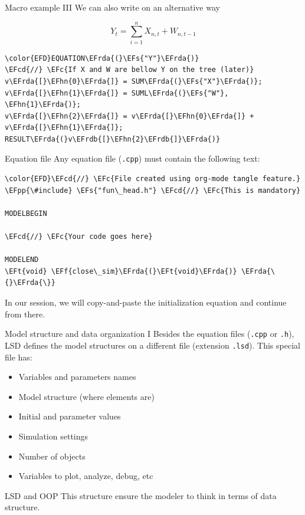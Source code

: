 \documentclass[bigger,aspectratio=169]{beamer}
\newcommand{\EFc}[1]{\textcolor{EFc}{#1}} %
\newcommand{\EFcd}[1]{\textcolor{EFcd}{#1}} %
\newcommand{\EFs}[1]{\textcolor{EFs}{#1}} %
\newcommand{\EFf}[1]{\textcolor{EFf}{#1}} %
\newcommand{\EFt}[1]{\textcolor{EFt}{#1}} %
\newcommand{\EFpp}[1]{\textcolor{EFpp}{\textbf{#1}}} %
\newcommand{\EFhn}[1]{\textcolor{EFhn}{\textbf{#1}}} %
\newcommand{\EFrda}[1]{\textcolor{EFrda}{#1}} %
\newcommand{\EFrdb}[1]{\textcolor{EFrdb}{#1}} %
\begin{document}
\begin{frame}[label={sec:orgfd07e2e},fragile]{Macro example III}
 We can also write on an alternative way

\[Y_{t} = \sum_{i=1}^{n} X_{n,t} + W_{n,t-1}\]



\begin{Code}
\begin{Verbatim}
\color{EFD}EQUATION\EFrda{(}\EFs{"Y"}\EFrda{)}
\EFcd{//} \EFc{If X and W are bellow Y on the tree (later)}
v\EFrda{[}\EFhn{0}\EFrda{]} = SUM\EFrda{(}\EFs{"X"}\EFrda{)};
v\EFrda{[}\EFhn{1}\EFrda{]} = SUML\EFrda{(}\EFs{"W"}, \EFhn{1}\EFrda{)};
v\EFrda{[}\EFhn{2}\EFrda{]} = v\EFrda{[}\EFhn{0}\EFrda{]} + v\EFrda{[}\EFhn{1}\EFrda{]};
RESULT\EFrda{(}v\EFrdb{[}\EFhn{2}\EFrdb{]}\EFrda{)}
\end{Verbatim}
\end{Code}
\end{frame}
\begin{frame}[label={sec:org08d774a},fragile]{Equation file}
 Any equation file (\texttt{.cpp}) must contain the following text:
\begin{Code}
\begin{Verbatim}
\color{EFD}\EFcd{//} \EFc{File created using org-mode tangle feature.}
\EFpp{\#include} \EFs{"fun\_head.h"} \EFcd{//} \EFc{This is mandatory}

MODELBEGIN

\EFcd{//} \EFc{Your code goes here}

MODELEND
\EFt{void} \EFf{close\_sim}\EFrda{(}\EFt{void}\EFrda{)} \EFrda{\{}\EFrda{\}}
\end{Verbatim}
\end{Code}

In our session, we will copy-and-paste the initialization equation and continue from there.
\end{frame}
\begin{frame}[label={sec:org6f4b402},fragile]{Model structure and data organization I}
 Besides the equation files (\texttt{.cpp} or \texttt{.h}), LSD defines the model structures on a different file (extension \texttt{.lsd}).
This special file has:

\begin{itemize}
\item Variables and parameters names
\item Model structure (where elements are)
\item Initial and parameter values
\item Simulation settings
\item Number of objects
\item Variables to plot, analyze, debug, etc
\end{itemize}
\begin{block}{LSD and OOP}
This structure ensure the modeler to think in terms of data structure.
\end{block}
\end{frame}
\end{document}
